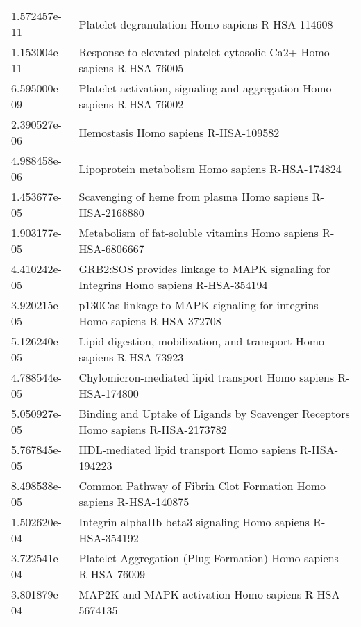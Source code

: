 \begin{longtable}{p{2.4cm}p{14.5cm}}
\bottomrule
\endlastfoot
             1.572457e-11 &                                     Platelet degranulation Homo sapiens R-HSA-114608 \\
             1.153004e-11 &                Response to elevated platelet cytosolic Ca2+ Homo sapiens R-HSA-76005 \\
             6.595000e-09 &              Platelet activation, signaling and aggregation Homo sapiens R-HSA-76002 \\
             2.390527e-06 &                                                 Hemostasis Homo sapiens R-HSA-109582 \\
             4.988458e-06 &                                     Lipoprotein metabolism Homo sapiens R-HSA-174824 \\
             1.453677e-05 &                            Scavenging of heme from plasma Homo sapiens R-HSA-2168880 \\
             1.903177e-05 &                        Metabolism of fat-soluble vitamins Homo sapiens R-HSA-6806667 \\
             4.410242e-05 &  GRB2:SOS provides linkage to MAPK signaling for Integrins Homo sapiens R-HSA-354194 \\
             3.920215e-05 &            p130Cas linkage to MAPK signaling for integrins Homo sapiens R-HSA-372708 \\
             5.126240e-05 &                Lipid digestion, mobilization, and transport Homo sapiens R-HSA-73923 \\
             4.788544e-05 &                       Chylomicron-mediated lipid transport Homo sapiens R-HSA-174800 \\
             5.050927e-05 &      Binding and Uptake of Ligands by Scavenger Receptors Homo sapiens R-HSA-2173782 \\
             5.767845e-05 &                               HDL-mediated lipid transport Homo sapiens R-HSA-194223 \\
             8.498538e-05 &                    Common Pathway of Fibrin Clot Formation Homo sapiens R-HSA-140875 \\
             1.502620e-04 &                          Integrin alphaIIb beta3 signaling Homo sapiens R-HSA-354192 \\
             3.722541e-04 &                       Platelet Aggregation (Plug Formation) Homo sapiens R-HSA-76009 \\
             3.801879e-04 &                                 MAP2K and MAPK activation Homo sapiens R-HSA-5674135 \\

\end{longtable}
